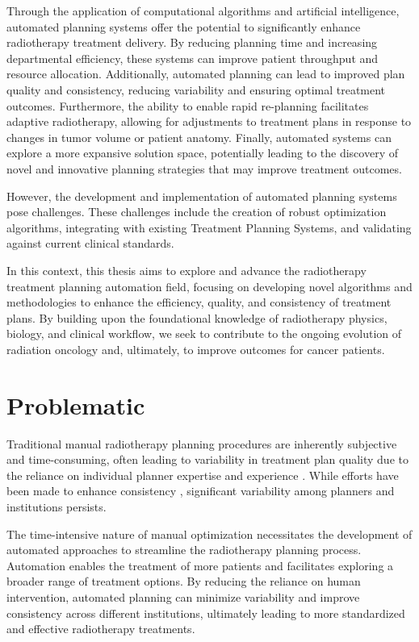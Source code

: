 Through the application of computational algorithms and artificial intelligence, automated planning systems offer the potential to significantly enhance radiotherapy treatment delivery.
By reducing planning time and increasing departmental efficiency, these systems can improve patient throughput and resource allocation.
Additionally, automated planning can lead to improved plan quality and consistency, reducing variability and ensuring optimal treatment outcomes.
Furthermore, the ability to enable rapid re-planning facilitates adaptive radiotherapy, allowing for adjustments to treatment plans in response to changes in tumor volume or patient anatomy.
Finally, automated systems can explore a more expansive solution space, potentially leading to the discovery of novel and innovative planning strategies that may improve treatment outcomes.

However, the development and implementation of automated planning systems pose challenges.
These challenges include the creation of robust optimization algorithms, integrating with existing Treatment Planning Systems, and validating against current clinical standards.

In this context, this thesis aims to explore and advance the radiotherapy treatment planning automation field, focusing on developing novel algorithms and methodologies to enhance the efficiency, quality, and consistency of treatment plans.
By building upon the foundational knowledge of radiotherapy physics, biology, and clinical workflow, we seek to contribute to the ongoing evolution of radiation oncology and, ultimately, to improve outcomes for cancer patients.

\section{Problematic}
Traditional manual radiotherapy planning procedures are inherently subjective and time-consuming, often leading to variability in treatment plan quality due to the reliance on individual planner expertise and experience \cite{Chung2008,Bohsung2005,Das2008,Williams2007}.
While efforts have been made to enhance consistency \cite{Bahm2011}, significant variability among planners and institutions persists.

The time-intensive nature of manual optimization necessitates the development of automated approaches to streamline the radiotherapy planning process.
Automation enables the treatment of more patients and facilitates exploring a broader range of treatment options.
By reducing the reliance on human intervention, automated planning can minimize variability and improve consistency across different institutions, ultimately leading to more standardized and effective radiotherapy treatments.

